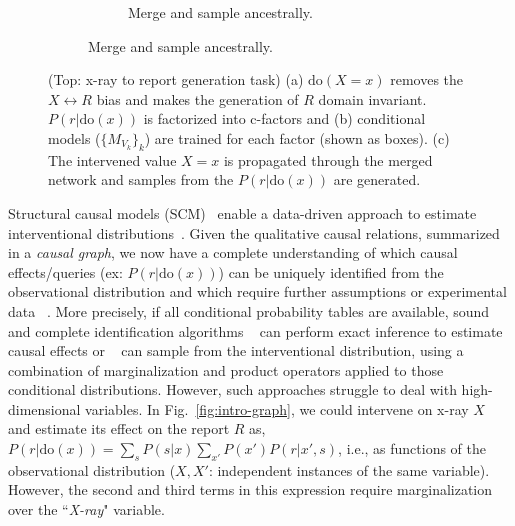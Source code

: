 \documentclass{article}
\newcommand{\Do}{\text{do}}
\theoremstyle{plain}
\theoremstyle{definition}
\theoremstyle{remark}
\begin{document}
\begin{figure}[t!]
\begin{subfigure}{1\textwidth}
\begin{subfigure}{.31\textwidth}
\begin{tikzpicture}[scale=0.7, transform shape]
  
        \end{tikzpicture}
        \caption{Merge and sample ancestrally.
}
\label{fig:merge-net}
\end{subfigure}
%
\end{subfigure}

    \caption{
    (Top: x-ray to report generation task)
    (a) $\Do(X=x)$ removes the $X\leftrightarrow R$ bias and makes the generation of $R$ domain invariant.
 $P(r|\Do(x))$ is factorized into c-factors and (b) conditional models ($\{M_{V_k}\}_{k}$) are trained for each factor (shown as boxes).  (c) The intervened value $X=x$ is propagated through the merged network and samples from the $P(r|\Do(x))$ are generated.
}
    \label{fig:double_motiv}
    \vspace{-4.5mm}
\end{figure}
\par
%
Structural causal models (SCM)~\citep{pearl2009causality} enable a data-driven approach to estimate interventional distributions~\citep{shalit2017estimating,louizos2017causal}.
Given the qualitative causal relations, summarized in a \emph{causal graph}, we now have a complete understanding of which causal effects/queries (ex: $P(r|\Do(x))$) can be uniquely identified from the observational distribution and which require further assumptions or experimental data 
~\citep{
bareinboim2012causal, huang2006identifiability, lee2020general, pearl1995causal, shpitser2008complete, tian2002studies}.
More precisely, 
if all conditional probability tables are available,
sound and complete identification algorithms
~\citep{tian2002general,shpitser2008complete} can perform exact inference to estimate causal effects or 
~\cite{bhattacharyya2020learning,
bhattacharyya2022efficient,
jung2020learning}
can sample from the interventional distribution,
using a combination of marginalization and product operators applied to those conditional distributions. However, such approaches struggle to deal with high-dimensional variables.
In  Fig.~\ref{fig:intro-graph}, 
we could intervene on  x-ray $X$  and estimate its effect on the 
 report $R$ as,
$P(r|\Do(x))=\sum_{s} P(s|x) \sum_{x'}P(x')P(r|x',s) $, i.e., as functions of the observational distribution ($X,X'$: independent instances of the same variable). However, the second and third terms in this expression require marginalization over the ``\emph{X-ray}" variable.
\end{document}
